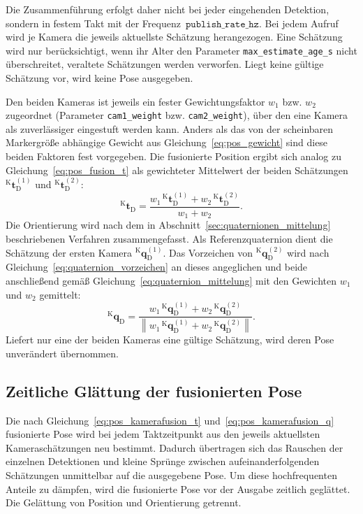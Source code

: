 Die Zusammenführung erfolgt daher nicht bei jeder eingehenden Detektion, sondern in festem Takt mit der Frequenz~$\mathtt{publish\_rate\_hz}$.
Bei jedem Aufruf wird je Kamera die jeweils aktuellste Schätzung herangezogen.
Eine Schätzung wird nur berücksichtigt, wenn ihr Alter den Parameter \texttt{max\_estimate\_age\_s} nicht überschreitet, veraltete Schätzungen werden verworfen.
Liegt keine gültige Schätzung vor, wird keine Pose ausgegeben.

Den beiden Kameras ist jeweils ein fester Gewichtungsfaktor $w_1$ bzw. $w_2$ zugeordnet (Parameter \texttt{cam1\_weight} bzw. \texttt{cam2\_weight}), über den eine Kamera als zuverlässiger eingestuft werden kann.
Anders als das von der scheinbaren Markergröße abhängige Gewicht aus Gleichung~\eqref{eq:pos_gewicht} sind diese beiden Faktoren fest vorgegeben.
Die fusionierte Position ergibt sich analog zu Gleichung~\eqref{eq:pos_fusion_t} als gewichteter Mittelwert der beiden Schätzungen $^{\mathrm{K}}\mathbf{t}_{\mathrm{D}}^{(1)}$ und $^{\mathrm{K}}\mathbf{t}_{\mathrm{D}}^{(2)}$:
\begin{equation}
^{\mathrm{K}}\mathbf{t}_{\mathrm{D}} = \frac{w_1\,{^{\mathrm{K}}\mathbf{t}_{\mathrm{D}}^{(1)}} + w_2\,{^{\mathrm{K}}\mathbf{t}_{\mathrm{D}}^{(2)}}}{w_1 + w_2}.
\label{eq:pos_kamerafusion_t}
\end{equation}
Die Orientierung wird nach dem in Abschnitt~\ref{sec:quaternionen_mittelung} beschriebenen Verfahren zusammengefasst.
Als Referenzquaternion dient die Schätzung der ersten Kamera $^{\mathrm{K}}\mathbf{q}_{\mathrm{D}}^{(1)}$.
Das Vorzeichen von $^{\mathrm{K}}\mathbf{q}_{\mathrm{D}}^{(2)}$ wird nach Gleichung~\eqref{eq:quaternion_vorzeichen} an dieses angeglichen und beide anschließend gemäß Gleichung~\eqref{eq:quaternion_mittelung} mit den Gewichten $w_1$ und $w_2$ gemittelt:
\begin{equation}
^{\mathrm{K}}\mathbf{q}_{\mathrm{D}} = \frac{w_1\,{^{\mathrm{K}}\mathbf{q}_{\mathrm{D}}^{(1)}} + w_2\,{^{\mathrm{K}}\mathbf{q}_{\mathrm{D}}^{(2)}}}{\left\lVert w_1\,{^{\mathrm{K}}\mathbf{q}_{\mathrm{D}}^{(1)}} + w_2\,{^{\mathrm{K}}\mathbf{q}_{\mathrm{D}}^{(2)}} \right\rVert}.
\label{eq:pos_kamerafusion_q}
\end{equation}
Liefert nur eine der beiden Kameras eine gültige Schätzung, wird deren Pose unverändert übernommen.


\subsection{Zeitliche Glättung der fusionierten Pose}
\label{subsec:pos_glaettung}
Die nach Gleichung~\eqref{eq:pos_kamerafusion_t} und~\eqref{eq:pos_kamerafusion_q} fusionierte Pose wird bei jedem 
Taktzeitpunkt aus den jeweils aktuellsten Kameraschätzungen neu bestimmt.
Dadurch übertragen sich das Rauschen der einzelnen Detektionen und kleine Sprünge zwischen aufeinanderfolgenden Schätzungen unmittelbar auf die ausgegebene Pose.
Um diese hochfrequenten Anteile zu dämpfen, wird die fusionierte Pose vor der Ausgabe zeitlich geglättet.
Die Gelättung von Position und Orientierung getrennt. 

